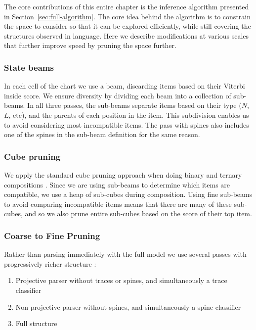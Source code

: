 The core contributions of this entire chapter is the inference algorithm presented in Section~\ref{sec:full-algorithm}.
The core idea behind the algorithm is to constrain the space to consider so that it can be explored efficiently, while still covering the structures observed in language.
Here we describe modifications at various scales that further improve speed by pruning the space further.

\subsubsection{State beams}

In each cell of the chart we use a beam, discarding items based on their Viterbi inside score.
We ensure diversity by dividing each beam into a collection of sub-beams.
In all three passes, the sub-beams separate items based on their type ($N$, $L$, etc), and the parents of each position in the item.
This subdivision enables us to avoid considering most incompatible items.
The pass with spines also includes one of the spines in the sub-beam definition for the same reason.

\subsubsection{Cube pruning}

We apply the standard cube pruning approach when doing binary and ternary compositions \parencite{Chiang:2007}.
Since we are using sub-beams to determine which items are compatible, we use a heap of sub-cubes during composition.
Using fine sub-beams to avoid comparing incompatible items means that there are many of these sub-cubes, and so we also prune entire sub-cubes based on the score of their top item.

\subsubsection{Coarse to Fine Pruning}

Rather than parsing immediately with the full model we use several passes with progressively richer structure \parencite{Goodman:1997}:

\begin{enumerate}
  \item Projective parser without traces or spines, and simultaneously a trace classifier
  \item Non-projective parser without spines, and simultaneously a spine classifier
  \item Full structure
\end{enumerate}

